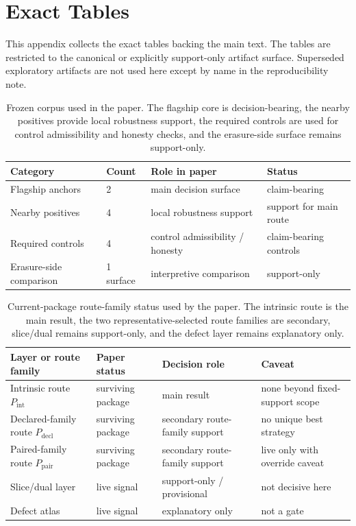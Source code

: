 \documentclass[11pt]{article}
\theoremstyle{definition}
\begin{document}
 \section{Exact Tables}\label{app:tables}

This appendix collects the exact tables backing the main text. The tables are restricted to the canonical or explicitly support-only artifact surface. Superseded exploratory artifacts are not used here except by name in the reproducibility note.

\begin{table}[H]
\centering
\caption{Frozen corpus used in the paper. The flagship core is decision-bearing, the nearby positives provide local robustness support, the required controls are used for control admissibility and honesty checks, and the erasure-side surface remains support-only.}
\label{tab:exact-corpus-freeze}
\begin{tabularx}{\linewidth}{@{}l l >{\raggedright\arraybackslash}X >{\raggedright\arraybackslash}X@{}}
\hline
Category & Count & Role in paper & Status \\
\hline
Flagship anchors & 2 & main decision surface & claim-bearing \\
Nearby positives & 4 & local robustness support & support for main route \\
Required controls & 4 & control admissibility / honesty & claim-bearing controls \\
Erasure-side comparison & 1 surface & interpretive comparison & support-only \\
\hline
\end{tabularx}
\end{table}
 
\begin{table}[H]
\centering
\caption{Current-package route-family status used by the paper. The intrinsic route is the main result, the two representative-selected route families are secondary, slice/dual remains support-only, and the defect layer remains explanatory only.}
\label{tab:exact-current-package-atlas}
\begin{tabularx}{\linewidth}{@{}l l >{\raggedright\arraybackslash}X >{\raggedright\arraybackslash}X@{}}
\hline
Layer or route family & Paper status & Decision role & Caveat \\
\hline
Intrinsic route $P_{\mathrm{int}}$ & surviving package & main result & none beyond fixed-support scope \\
Declared-family route $P_{\mathrm{decl}}$ & surviving package & secondary route-family support & no unique best strategy \\
Paired-family route $P_{\mathrm{pair}}$ & surviving package & secondary route-family support & live only with override caveat \\
Slice/dual layer & live signal & support-only / provisional & not decisive here \\
Defect atlas & live signal & explanatory only & not a gate \\
\hline
\end{tabularx}
\end{table}
 
\end{document}

